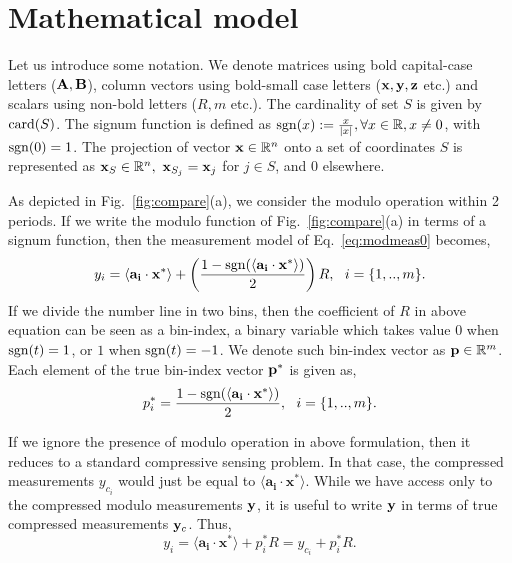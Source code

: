 \section{Mathematical model}
\label{sec:model}
Let us introduce some notation. We denote matrices using bold capital-case letters ($\mathbf{A,B}$), column vectors using bold-small case letters ($\mathbf{x,y,z}$ etc.) and scalars using non-bold letters ($R,m$ etc.). %
The cardinality of set $S$ is given by $\mathrm{card}(S)$. The signum function is defined as $\mathrm{sgn}(x) := \frac{x}{|x|}, \forall x \in {\mathbb{R}}, x \neq 0$, with $\mathrm{sgn}(0)=1$. %
The projection of vector $\mathbf{x} \in {\mathbb{R}}^n$ onto a set of coordinates $S$ is represented as $\mathbf{x}_S \in {\mathbb{R}}^n,~\mathbf{x}_{S_j} = \mathbf{x}_j$ for $j \in S$, and $0$ elsewhere.

As depicted in Fig.~\ref{fig:compare}(a), we consider the modulo operation within 2 periods.
If we write the modulo function of Fig.~\ref{fig:compare}(a) in terms of a signum function, then the measurement model of Eq.~\ref{eq:modmeas0} becomes, 
\begin{equation}
y_i= \langle \mathbf{a_i} \cdot \mathbf{x^*} \rangle+\left( \frac{1-\mathrm{sgn}(\langle \mathbf{a_i} \cdot \mathbf{x^*} \rangle)}{2}\right)R,~~i = \{1,..,m\}.
\label{eq:modmeas2}
\end{equation} 
If we divide the number line in two bins, then the coefficient of $R$ in above equation can be seen as a bin-index, a binary variable which takes value $0$ when $\mathrm{sgn}(t)=1$, or $1$ when $\mathrm{sgn}(t)=-1$. We denote such bin-index vector as $\mathbf{p} \in {\mathbb{R}}^m$. Each element of the true bin-index vector $\mathbf{p}^*$ is given as,
$$
p^*_i = \frac{1-\mathrm{sgn}(\langle \mathbf{a_i} \cdot \mathbf{x^*} \rangle)}{2},~~i = \{1,..,m\}.
$$

If we ignore the presence of modulo operation in above formulation, then it reduces to a standard compressive sensing problem. In that case, the compressed measurements $y_{c_i}$ would just be equal to $\langle \mathbf{a_i} \cdot \mathbf{x^*} \rangle$. While we have access only to the compressed modulo measurements $\mathbf{y}$, it is useful to write $\mathbf{y}$ in terms of true compressed measurements $\mathbf{y}_c$. Thus,
$$
y_i = \langle \mathbf{a_i} \cdot \mathbf{x^*} \rangle + p^*_iR = y_{c_i}+p^*_iR.
$$

